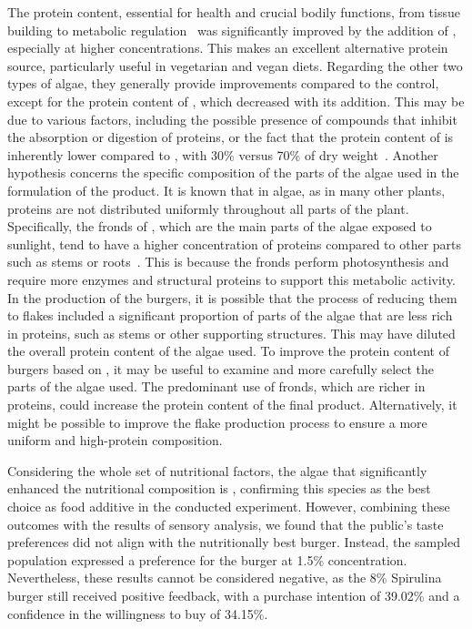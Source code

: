 The protein content, essential for health and crucial bodily functions, from tissue building to metabolic regulation~\parencite{chang_Protein_2017} was significantly improved by the addition of , especially at higher concentrations. This makes  an excellent alternative protein source, particularly useful in vegetarian and vegan diets.
Regarding the other two types of algae, they generally provide improvements compared to the control, except for the protein content of , which decreased with its addition.
This may be due to various factors, including the possible presence of compounds that inhibit the absorption or digestion of proteins, or the fact that the protein content of  is inherently lower compared to , with \num{30}\% versus \num{70}\% of dry weight~\parencite{fleurence_Seaweed_2004}.
Another hypothesis concerns the specific composition of the parts of the algae used in the formulation of the product. It is known that in algae, as in many other plants, proteins are not distributed uniformly throughout all parts of the plant. Specifically, the fronds of , which are the main parts of the algae exposed to sunlight, tend to have a higher concentration of proteins compared to other parts such as stems or roots~\parencite{galland-irmouli_Nutritional_1999}.
This is because the fronds perform photosynthesis and require more enzymes and structural proteins to support this metabolic activity. In the production of the burgers, it is possible that the process of reducing them to flakes included a significant proportion of parts of the algae that are less rich in proteins, such as stems or other supporting structures. This may have diluted the overall protein content of the algae used. To improve the protein content of burgers based on , it may be useful to examine and more carefully select the parts of the algae used. The predominant use of fronds, which are richer in proteins, could increase the protein content of the final product. Alternatively, it might be possible to improve the flake production process to ensure a more uniform and high-protein composition.

Considering the whole set of nutritional factors, the algae that significantly enhanced the nutritional composition is , confirming this species as the best choice as food additive in the conducted experiment.
However, combining these outcomes with the results of sensory analysis, we found that the public’s taste preferences did not align with the nutritionally best burger. Instead, the sampled population expressed a preference for the  burger at \num{1.5}\% concentration. Nevertheless, these results cannot be considered negative, as the \num{8}\% Spirulina burger still received positive feedback, with a purchase intention of \num{39.02}\% and a confidence in the willingness to buy of \num{34.15}\%.

